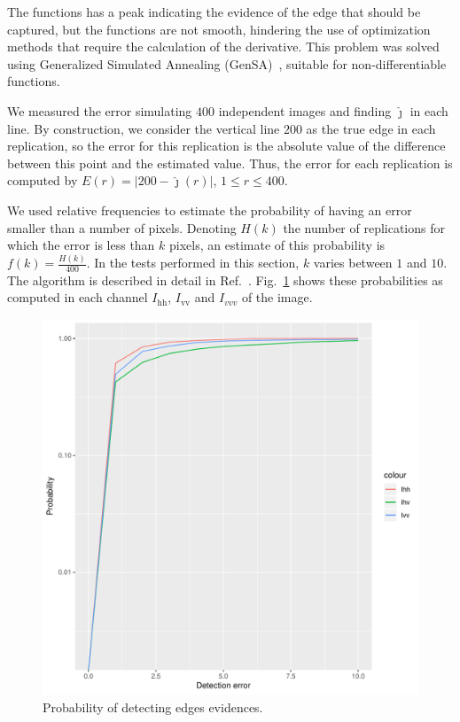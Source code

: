 \documentclass[conference]{IEEEtran}
\begin{document}
The functions has a peak indicating the evidence of the edge that should be captured, but the functions are not smooth, hindering the use of optimization methods that require the calculation of the derivative.
This problem was solved using Generalized Simulated Annealing (GenSA)~\cite{xgsh}, suitable for non-differentiable functions.
    
We measured the error simulating $400$ independent images and finding $\widehat\jmath$ in each line.
By construction, we consider the vertical line $200$ as the true edge in each replication, so the error for this replication is the absolute value of the difference between this point and the estimated value. 
Thus, the error for each replication is computed by $E(r) = |200 - \widehat{\jmath}(r)|$, $1\leq r \leq 400$.

We used relative frequencies to estimate the probability of having an error smaller than a number of pixels. 
Denoting $H(k)$ the number of replications for which the error is less than $k$ pixels, an estimate of this probability is $f(k)=\frac{H(k)}{400}$. 
In the tests performed in this section, $k$ varies between $1$ and $10$. 
The algorithm is described in detail in Ref.~\cite{fbgm}.
Fig.~\ref{probability_edge_detc} shows these probabilities as computed in each channel $I_\text{hh}$, $I_\text{vv}$ and $I_{vvv}$ of the image. 
  
\begin{figure}[hbt]
	\centering
	\includegraphics[width=.7\linewidth]{metricas_ihh_ivh_ivv_nhfc_artigos}%
	\caption{Probability of detecting edges evidences.}
\label{probability_edge_detc}
\end{figure}
\end{document}
